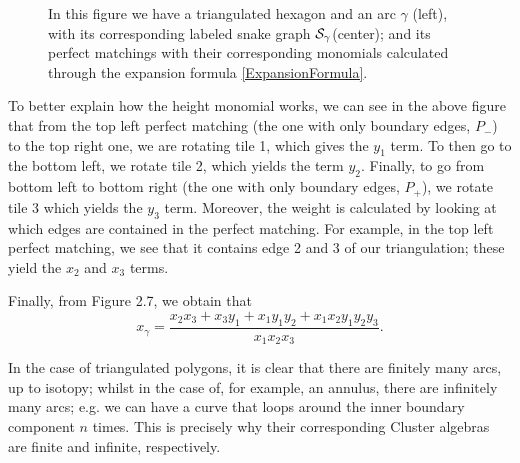 \begin{figure}[H]
\begin{tikzpicture}[x=0.75pt,y=0.75pt,yscale=-1,xscale=1]
\end{tikzpicture}

\caption{In this figure we have a triangulated hexagon and an arc $\gamma$ (left), with its corresponding labeled snake graph $\s_{\gamma}$(center); and its perfect matchings with their corresponding monomials calculated through the expansion formula \ref{ExpansionFormula}.}
\end{figure}

To better explain how the height monomial works, we can see in the above figure that from the top left perfect matching (the one with only boundary edges, $P_-$) to the top right one, we are rotating tile 1, which gives the $y_1$ term. To then go to the bottom left, we rotate tile 2, which yields the term $y_2$. Finally, to go from bottom left to bottom right (the one with only boundary edges, $P_+$), we rotate tile 3 which yields the $y_3$ term. Moreover, the weight is calculated by looking at which edges are contained in the perfect matching. For example, in the top left perfect matching, we see that it contains edge 2 and 3 of our triangulation; these yield the $x_2$ and $x_3$ terms.

Finally, from Figure 2.7, we obtain that
\begin{equation*}
    x_{\gamma} = \dfrac{x_2x_3 + x_3y_1 + x_1y_1y_2 + x_1x_2y_1y_2y_3}{x_1x_2x_3}.
\end{equation*}

In the case of triangulated polygons, it is clear that there are finitely many arcs, up to isotopy; whilst in the case of, for example, an annulus, there are infinitely many arcs; e.g. we can have a curve that loops around the inner boundary component $n$ times. This is precisely why their corresponding Cluster algebras are finite and infinite, respectively. 


